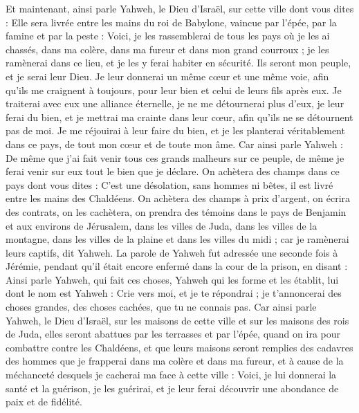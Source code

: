 \begin{multicols}{2}
Et maintenant, ainsi parle Yahweh, le Dieu d'Israël, sur cette ville dont vous dites : Elle sera livrée entre les mains du roi de Babylone, vaincue par l'épée, par la famine et par la peste :
Voici, je les rassemblerai de tous les pays où je les ai chassés, dans ma colère, dans ma fureur et dans mon grand courroux ;  je les ramènerai dans ce lieu, et je les y ferai habiter en sécurité.
Ils seront mon peuple, et je serai leur Dieu.
Je leur donnerai un même cœur et une même voie, afin qu'ils me craignent à toujours, pour leur bien et celui de leurs fils après eux.
Je traiterai avec eux une alliance éternelle, je ne me détournerai plus d'eux, je leur ferai du bien, et je mettrai ma crainte dans leur cœur, afin qu'ils ne se détournent pas de moi.
Je me réjouirai à leur faire du bien, et je les planterai véritablement dans ce pays, de tout mon cœur et de toute mon âme.
Car ainsi parle Yahweh : De même que j'ai fait venir tous ces grands malheurs sur ce peuple, de même je ferai venir sur eux tout le bien que je déclare.
On achètera des champs dans ce pays dont vous dites : C’est une désolation, sans hommes ni bêtes, il est livré entre les mains des Chaldéens.
On achètera des champs à prix d'argent, on écrira des contrats, on les cachètera, on prendra des témoins dans le pays de Benjamin et aux environs de Jérusalem, dans les villes de Juda, dans les villes de la montagne, dans les villes de la plaine et dans les villes du midi ; car je ramènerai leurs captifs, dit Yahweh.
\VerseOne{}La parole de Yahweh fut adressée une seconde fois à Jérémie, pendant qu’il était encore enfermé dans la cour de la prison, en disant :
Ainsi parle Yahweh, qui fait ces choses, Yahweh qui les forme et les établit, lui dont le nom est Yahweh :
Crie vers moi, et je te répondrai ; je t’annoncerai des choses grandes, des choses cachées, que tu ne connais pas.
Car ainsi parle Yahweh, le Dieu d'Israël, sur les maisons de cette ville et sur les maisons des rois de Juda, elles seront abattues par les terrasses et par l'épée,
quand on ira pour combattre contre les Chaldéens, et que leurs maisons seront remplies des cadavres des hommes que je frapperai dans ma colère et dans ma fureur, et à cause de la méchanceté desquels je cacherai ma face à cette ville :
Voici, je lui donnerai la santé et la guérison, je les guérirai, et je leur ferai découvrir une abondance de paix et de fidélité.

\end{multicols}
